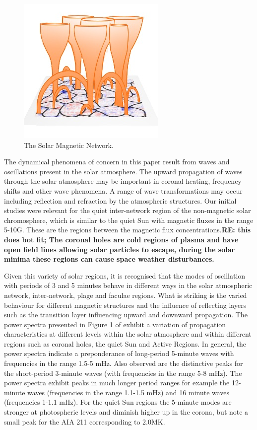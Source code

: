 \documentclass{aastex62}
\begin{document}
\begin{figure}[h]\label{magneticnetwork}
\includegraphics[scale=1.0]{imrescale/solar-network-v1.jpg}
\caption{The Solar Magnetic Network.}
\end{figure}

 
The dynamical phenomena of concern in this paper result from waves and oscillations present in the solar atmosphere. The upward propagation of waves through the solar atmosphere may be important in coronal heating, frequency shifts and other wave phenomena. A range of wave transformations may occur including reflection and refraction by the atmospheric structures. Our initial studies were relevant for the quiet inter-network region of the non-magnetic solar chromosphere, which is similar to the quiet Sun with magnetic fluxes in the range 5-10G. These are the regions between the magnetic flux concentrations.{\bf RE: this does bot fit; The coronal holes are cold regions of plasma  and  have open field lines allowing solar particles to escape, during the solar minima these regions can cause space weather disturbances. }

 Given this variety of solar regions, it is recognised that the modes of oscillation with periods of 3 and 5 minutes behave in different ways in the solar atmospheric network, inter-network, plage and faculae regions. What is striking is the varied behaviour for different magnetic structures and the influence of reflecting layers such as the transition layer influencing upward and downward propagation.  The power spectra presented in Figure 1 of \citet{Griffiths2018} exhibit a variation of propagation characteristics at different levels within the solar atmosphere and within different regions such as coronal holes, the quiet Sun and Active Regions. In general, the power spectra indicate a preponderance of long-period 5-minute waves with frequencies in the range 1.5-5 mHz. Also observed are the distinctive peaks for the short-period 3-minute waves (with frequencies in the range 5-8 mHz). The power spectra exhibit peaks in much longer period ranges for example the 12-minute waves  (frequencies in the range 1.1-1.5 mHz) and 16 minute waves (frequencies 1-1.1 mHz). For the quiet Sun regions the 5-minute modes are stronger at photospheric levels and diminish higher up in the corona, but note a small peak for the AIA 211 corresponding to 2.0MK. 
\end{document}
